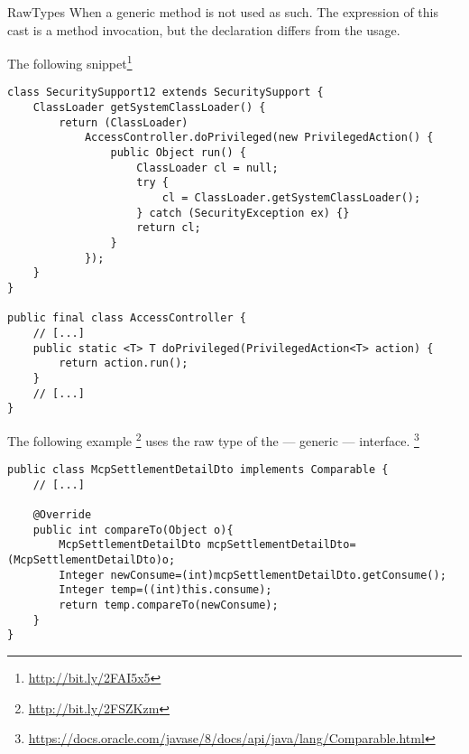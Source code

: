 \begin{pattern}{RawTypes}
When a generic method is not used as such.
The expression of this cast is a method invocation,
but the declaration differs from the usage.

\instances{}
The following snippet\footnote{\url{http://bit.ly/2FAI5x5}}

\begin{verbatim}
class SecuritySupport12 extends SecuritySupport {
    ClassLoader getSystemClassLoader() {
        return (ClassLoader)
            AccessController.doPrivileged(new PrivilegedAction() {
                public Object run() {
                    ClassLoader cl = null;
                    try {
                        cl = ClassLoader.getSystemClassLoader();
                    } catch (SecurityException ex) {}
                    return cl;
                }
            });
    }
}

public final class AccessController {
    // [...]
    public static <T> T doPrivileged(PrivilegedAction<T> action) {
        return action.run();
    }
    // [...]
}
\end{verbatim}

The following example%
\footnote{\url{http://bit.ly/2FSZKzm}}
uses the raw type of the  --- generic --- interface.%
\footnote{\url{https://docs.oracle.com/javase/8/docs/api/java/lang/Comparable.html}}

\begin{verbatim}
public class McpSettlementDetailDto implements Comparable {
    // [...]

    @Override
    public int compareTo(Object o){
        McpSettlementDetailDto mcpSettlementDetailDto=(McpSettlementDetailDto)o;
        Integer newConsume=(int)mcpSettlementDetailDto.getConsume();
        Integer temp=((int)this.consume);
        return temp.compareTo(newConsume);
    }
}
\end{verbatim}




\detection{}

\discussion{}

\related{}

\end{pattern}